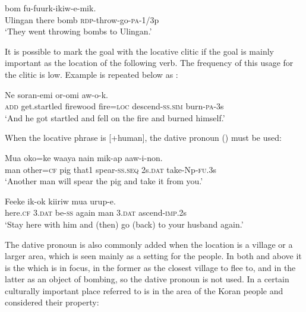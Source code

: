 \ea%
\label{ex:4:x863}
\gll {}   bom  fu-fuurk-ikiw-e-mik. \\
    Ulingan  there  bomb  \textsc{rdp}-throw-go-\textsc{pa}-1/3p  \\
\glt`They went throwing bombs to Ulingan.'
\z

It is possible to mark the goal with the locative clitic if the goal is mainly important as the location of the following verb. The frequency of this usage for the clitic is low. Example  is repeated below as : 

\ea%
\label{ex:4:x1884}
\gll Ne  soran-emi    or-omi  aw-o-k.
 \\
    \textsc{add}  get.startled  firewood  fire=\textsc{loc} descend-\textsc{ss}.\textsc{sim}  burn-\textsc{pa}-3s \\
\glt `And he got startled and fell on the fire and burned himself.'
\z

 

When the locative phrase is [+human], the dative pronoun () must be used:

\ea%
\label{ex:4:x1061}
\gll Mua  oko=ke  waaya  nain  mik-ap   aaw-i-non. \\
     man  other=\textsc{cf}  pig  that1  spear-\textsc{ss}.\textsc{seq}  2s.\textsc{dat}  take-Np-\textsc{fu}.3s \\
\glt`Another man will spear the pig and take it from you.'
\z

\ea%
\label{ex:4:x1939}
\gll Feeke    ik-ok  kiiriw  mua    urup-e. \\
    here.\textsc{cf}  3.\textsc{dat}  be-\textsc{ss}  again  man  3.\textsc{dat}  ascend-\textsc{imp}.2s  \\
\glt`Stay here with him and (then) go (back) to your husband again.'
\z

The dative pronoun is also commonly added when the location is a village or a larger area, which is seen mainly as a setting for the people. In both  and  above it is the  which is in focus, in the former as the closest village to flee to, and in the latter as an object of bombing, so the dative pronoun is not used. In  a certain culturally important place referred to is in the area of the Koran people and considered their property:


